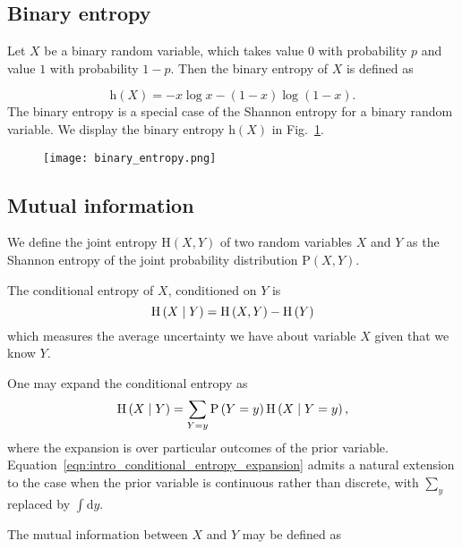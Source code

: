 \FloatBarrier
\subsection{Binary entropy}
Let $X$ be a binary random variable, which takes value $0$ with probability $p$ and value $1$ with probability $1-p$. Then the binary entropy of $X$ is defined as

\begin{equation}
\text{h}\left(X\right) = - x \log x - \left(1-x\right) \log \left(1-x\right).
\end{equation}
The binary entropy is a special case of the Shannon entropy for a binary random variable. We display the binary entropy $\text{h}\left(X\right)$ in Fig.~\ref{fig:binary_entropy}.

\begin{figure}
\centering
\texttt{[image: binary\_entropy.png]}
\caption{\label{fig:binary_entropy}}
\end{figure}


\FloatBarrier
\subsection{Mutual information}
We define the joint entropy $\text{H}\left(X, Y\right)$ of two random variables $X$ and $Y$ as the Shannon entropy of the joint probability distribution $\text{P}\left(X, Y\right)$. 

The conditional entropy of $X$, conditioned on $Y$ is
\begin{equation}
\text{H}\left(X \; \middle| \; Y\right) = \text{H}\left(X, Y\right) - \text{H}\left(Y\right)
\end{equation}
which measures the average uncertainty we have about variable $X$ given that we know $Y$.

One may expand the conditional entropy as \cite{Wilde2013}
\begin{equation}\label{eqn:intro_conditional_entropy_expansion}
\text{H}\left(X \; \middle| \; Y\right) = \sum_{Y=y} \text{P}\left(Y=y\right) \text{H}\left( X \; \middle| \; Y=y \right),
\end{equation}
where the expansion is over particular outcomes of the prior variable. Equation~\ref{eqn:intro_conditional_entropy_expansion} admits a natural extension to the case when the prior variable is continuous rather than discrete, with $\sum_{y}$ replaced by $\int \mathrm{d}y$.


The mutual information between $X$ and $Y$ may be defined as


